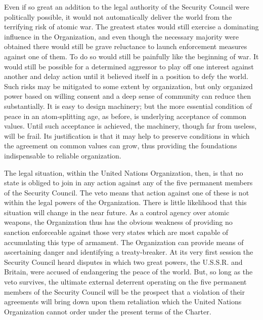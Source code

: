 Even if so great an addition to the legal authority of the Security Council were politically possible, it would not automatically deliver the world from the terrifying risk of atomic war. The greatest states would still exercise a dominating influence in the Organization, and even though the necessary majority were obtained there would still be grave reluctance to launch enforcement measures against one of them. To do so would still be painfully like the beginning of war. It would still be possible for a determined aggressor to play off one interest against another and delay action until it believed itself in a position to defy the world. Such risks may be mitigated to some extent by organization, but only organized power based on willing consent and a deep sense of community can reduce then substantially. It is easy to design machinery; but the more essential condition of peace in an atom-splitting age, as before, is underlying acceptance of common values. Until such acceptance is achieved, the machinery, though far from useless, will be frail. Its justification is that it may help to preserve conditions in which the agreement on common values can grow, thus providing the foundations indispensable to reliable organization.

The legal situation, within the United Nations Organization, then, is that no state is obliged to join in any action against any of the five permanent members of the Security Council. The veto means that action against one of these is not within the legal powers of the Organization. There is little likelihood that this situation will change in the near future. As a control agency over atomic weapons, the Organization thus has the obvious weakness of providing no sanction enforceable against those very states which are most capable of accumulating this type of armament. The Organization can provide means of ascertaining danger and identifying a treaty-breaker. At its very first session the Security Council heard disputes in which two great powers, the U.S.S.R. and Britain, were accused of endangering the peace of the world. But, so long as the veto survives, the ultimate external deterrent operating on the five permanent members of the Security Council will be the prospect that a violation of their agreements will bring down upon them retaliation which the United Nations Organization cannot order under the present terms of the Charter.

